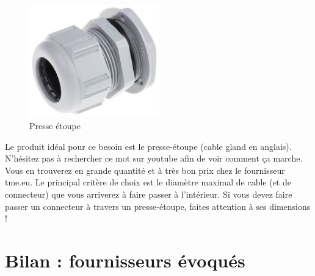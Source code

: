 \documentclass[a4paper, 11pt]{report}
\begin{document}
\begin{figure}[h]
\caption{Presse étoupe}

\centering{}\includegraphics[width=0.5\textwidth]{images/presse_etoupe.jpg}
\end{figure}

Le produit idéal pour ce besoin est le presse-étoupe (cable gland
en anglais). N'hésitez pas à rechercher ce mot sur youtube afin de
voir comment ça marche. Vous en trouverez en grande quantité et à
très bon prix chez le fournisseur tme.eu. Le principal critère de
choix est le diamètre maximal de cable (et de connecteur) que vous
arriverez à faire passer à l'intérieur. Si vous devez faire passer
un connecteur à travers un presse-étoupe, faites attention à ses dimensions
!

\chapter{Bilan : fournisseurs évoqués}
\end{document}
